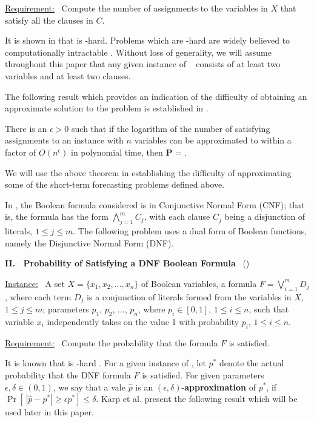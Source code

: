\smallskip
\noindent
\underline{Requirement:}~ Compute the number of assignments 
to the variables in $X$ that satisfy all the clauses in $C$. 

\medskip
It is shown in \cite{Vad-2001} that \mtsat{} is \cnump-hard.
Problems which are \cnump-hard are widely believed to 
computationally intractable \cite{GJ-1979}.
Without loss of generality, we will assume throughout this paper
that any given instance of ~\mtsat{} consists of
at least two variables and at least two clauses.

\medskip
The following result which provides an 
indication of the difficulty of obtaining an approximate solution to the
\mtsat{} problem is established in \cite{Zu-1996}.

\begin{theorem}\label{thm:m2sat_zuckerman}
There is an $\epsilon > 0$ such that if the logarithm of the number of satisfying
assignments to an \mtsat{} instance with $n$ variables can be approximated to within 
a factor of $O(n^{\epsilon})$ in polynomial time, then \textbf{P} = \cnp. \QED
\end{theorem}

We will use the above theorem in establishing the difficulty of approximating
some of the short-term forecasting problems defined above.

\medskip
In \mtsat, the Boolean formula considered is in 
Conjunctive Normal Form (CNF); that is, the formula
has the form $\displaystyle{\bigwedge_{j=1}^m C_j}$, with 
each clause $C_j$ being a disjunction of literals, $1 \leq j \leq m$. 
The following problem uses a dual form of Boolean
functions, namely the Disjunctive Normal Form (DNF).

\medskip

\noindent
\textbf{II.~ Probability of Satisfying a DNF Boolean Formula}~ (\dnfsat)

\smallskip
\noindent
\underline{Instance:}~ A set $X = \{x_1, x_2, \ldots, x_n\}$ of
Boolean variables, a formula 
$F = \displaystyle{\bigvee_{i=1}^{m} D_j}$, where each term $D_j$
is a conjunction of literals formed from the variables in $X$,
$1 \leq j \leq m$; parameters $p_1$, $p_2$, $\ldots$, $p_n$,
where  $p_i \in [0,1]$, $1 \leq i \leq n$, such that 
variable $x_i$ independently takes on the value 1
with probability $p_i$, $1 \leq i \leq n$.

\smallskip
\noindent
\underline{Requirement:}~ Compute the probability that the formula $F$ is satisfied.

\medskip
It is known that \dnfsat{} is \cnump-hard \cite{GJ-1979}.
For a given instance of \dnfsat, let $p^*$ denote the actual
probability that the DNF formula $F$ is satisfied.
For given parameters $\epsilon, \delta\in(0, 1)$, we say that a vale $\hat{p}$
is an $(\epsilon, \delta)$-\textbf{approximation} of $p^*$, if
$\Pr\left[\,|\hat{p} - p^*|\geq \epsilon p^*\right] \leq \delta$. 
Karp et al. \cite{karp:jc85} present the following result
which will be used later in this paper.

